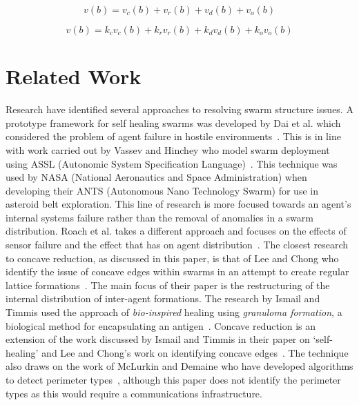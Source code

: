 \documentclass{ieeeaccess}
\begin{document}
\begin{equation}
\label{eq:BotDirection1}
v(b) = v_{c}(b) + v_{r}(b) + v_{d}(b) + v_{o}(b)
\end{equation}

\begin{equation}\label{eq:BotPhysics1}
v(b) = k_cv_c(b) + k_rv_r(b) + k_dv_d(b) + k_ov_o(b)
\end{equation}

\section{Related Work}\label{sec:RelatedWork}
Research have identified several approaches to resolving swarm structure issues. A prototype framework for self healing swarms was developed by Dai et al. which considered the problem of agent failure in hostile environments~\cite{DHMRZ:06}. This is in line with work carried out by Vassev and Hinchey who model swarm deployment using ASSL (Autonomic System Specification Language)~\cite{VH:09}. This technique was used by NASA (National Aeronautics and Space Administration) when developing their ANTS (Autonomous Nano Technology Swarm) for use in asteroid belt exploration. This line of research is more focused towards an agent's internal systems failure rather than the removal of anomalies in a swarm distribution. Roach et al. takes a different approach and focuses on the effects of sensor failure and the effect that has on agent distribution~\cite{RMT:15}. The closest research to concave reduction, as discussed in this paper, is that of Lee and Chong who identify the issue of concave edges within swarms in an attempt to create regular lattice formations~\cite{GN:08}. The main focus of their paper is the restructuring of the internal distribution of inter-agent formations. The research by Ismail and Timmis used the approach of \textit{bio-inspired} healing using \textit{granuloma formation}, a biological method for encapsulating an antigen~\cite{IT:10}.
Concave reduction is an extension of the work discussed by Ismail and Timmis in their paper on `self-healing' \cite{IT:10} and Lee and Chong's work on identifying concave edges~\cite{GN:08}. The technique also draws on the work of McLurkin and Demaine who have developed algorithms to detect perimeter types~\cite{MD:09}, although this paper does not identify the perimeter types as this would require a communications infrastructure.
\end{document}
